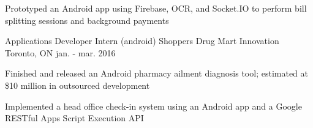 \begin{cventries}
{\begin{cvitems}
        \vspace{1.0mm}
        \item {Prototyped an Android app using Firebase, OCR, and Socket.IO to perform bill splitting sessions and background payments}
      \end{cvitems}
    }
  \vspace{2.4mm}
  \cventry
    {Applications Developer Intern (android)} %
    {Shoppers Drug Mart Innovation} %
    {Toronto, ON} %
    {jan. - mar. 2016} %
    {
      \begin{cvitems} %
        \vspace{1.0mm}
        \item {Finished and released an Android pharmacy ailment diagnosis tool; estimated at \$10 million in outsourced development}
        \vspace{1.0mm}
        \item {Implemented a head office check-in system using an Android app and a Google RESTful Apps Script Execution API}
      \end{cvitems}
    }    
\end{cventries}
